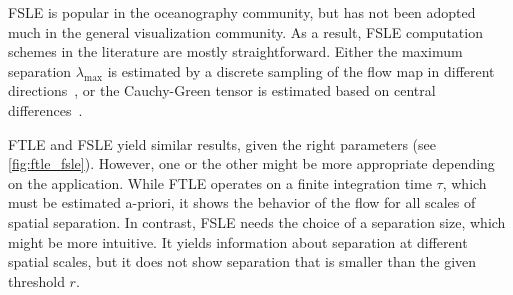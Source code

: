 %
\ac{FSLE} is popular in the oceanography community, but has not been adopted
much in the general visualization community.
%
As a result, \ac{FSLE} computation schemes in the literature are mostly
straightforward.
%
Either the maximum separation $\lambda_{\max}$ is estimated by a discrete
sampling of the flow map in different
directions~\cite{dOvidio2004,Hernandez-Carrasco2011}, or the Cauchy-Green tensor
is estimated based on central differences~\cite{Peikert2014}.
%

%
\ac{FTLE} and \ac{FSLE} yield similar results, given the right parameters (see
\cref{fig:ftle_fsle}).
%
However, one or the other might be more appropriate depending on the application.
%
While \ac{FTLE} operates on a finite integration time $\tau$, which must be
estimated a-priori, it shows the behavior of the flow for all scales of spatial
separation.
%
In contrast, \ac{FSLE} needs the choice of a separation size, which might be
more intuitive.
%
It yields information about separation at different spatial scales, but it does
not show separation that is smaller than the given threshold $r$.
%
%
%
